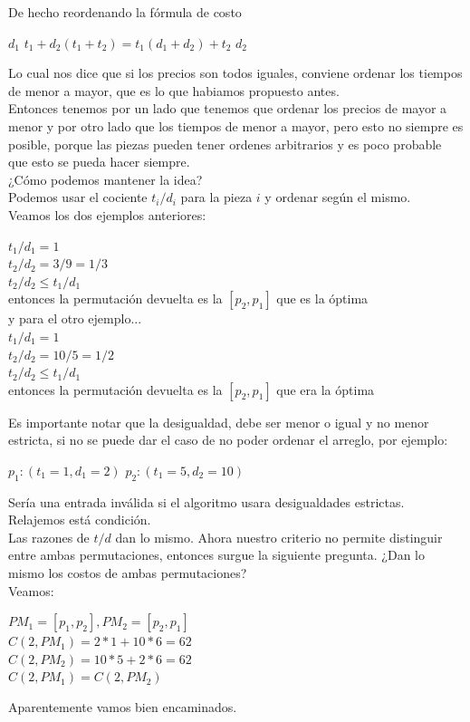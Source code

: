 \documentclass[11pt,a4paper]{article}
\newcommand{\bc}{\begin{center}}
\newcommand{\ec}{\end{center}}
\begin{document}
De hecho reordenando la fórmula de costo
\bc
$d_1$ $t_1 + d_2(t_1+t_2) = t_1(d_1+d_2) + t_2$ $d_2$
\ec
Lo cual nos dice que si los precios son todos iguales, conviene ordenar los tiempos de menor a mayor, que es lo que habiamos propuesto antes.\\
Entonces tenemos por un lado que tenemos que ordenar los precios de mayor a menor y por otro lado que los tiempos de menor a mayor, pero esto no siempre es posible, porque las piezas pueden tener ordenes arbitrarios y es poco probable que esto se pueda hacer siempre.\\
¿Cómo podemos mantener la idea?\\
Podemos usar el cociente $t_i/d_i$ para la pieza $i$ y ordenar según el mismo.\\
Veamos los dos ejemplos anteriores:\\
\bc
$t_1 / d_1 = 1$\\
$t_2 / d_2 = 3 / 9 = 1 / 3$\\
$t_2 / d_2 \le t_1 / d_1 $\\
entonces la permutación devuelta es la $[p_2, p_1]$ que es la óptima\\

y para el otro ejemplo...\\
$t_1 / d_1 = 1$\\
$t_2 / d_2 = 10 / 5 = 1 / 2$\\
$t_2 / d_2 \le t_1 / d_1 $\\
entonces la permutación devuelta es la $[p_2, p_1]$ que era la óptima\\
\ec

Es importante notar que la desigualdad, debe ser menor o igual y no menor estricta, si no se puede dar el caso de no poder ordenar el arreglo, por ejemplo:
\bc
$p_1 : (t_1 = 1, d_1 = 2)$
$p_2 : (t_1 = 5, d_2 = 10)$
\ec
Sería una entrada inválida si el algoritmo usara desigualdades estrictas. Relajemos está condición.\\
Las razones de $t / d$ dan lo mismo. Ahora nuestro criterio no permite distinguir entre ambas permutaciones, entonces surgue la siguiente pregunta. ¿Dan lo mismo los costos de ambas permutaciones?\\
Veamos:\\
\bc
$PM_1 = [p_1,p_2], PM_2 = [p_2, p_1]$\\
$C(2, PM_1) = 2*1 + 10*6 = 62 $\\
$C(2, PM_2) = 10*5 + 2*6 = 62 $\\ 
$C(2, PM_1) = C(2, PM_2)$
\ec
Aparentemente vamos bien encaminados.
\end{document}

